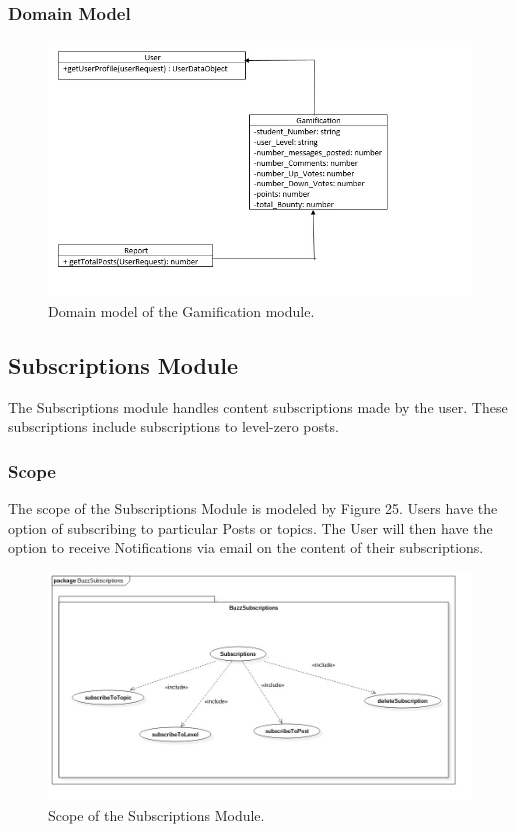 \documentclass[12pt]{article}
\begin{document}
\subsubsection{Domain Model}
\begin{figure}[h!]\includegraphics[width=\linewidth]{Diagrams/gamificationDomainModel.jpeg}
\caption{Domain model of the Gamification module.}
\end{figure}
\newpage


\subsection{Subscriptions Module}
\par{The Subscriptions module handles content subscriptions made by the user. These subscriptions include subscriptions to level-zero posts. }
\subsubsection{Scope}
\par{The scope of the Subscriptions Module is modeled by Figure 25. Users have the option of subscribing to particular Posts or topics. The User will then have the option to receive Notifications via email on the content of their subscriptions.}

\begin{figure}[h!]\includegraphics[width=\linewidth]{Diagrams/buzzSubscriptions.jpg}
\caption{Scope of the Subscriptions Module.}
\label{Use-case: Subscriptions}
\end{figure}
\end{document}
